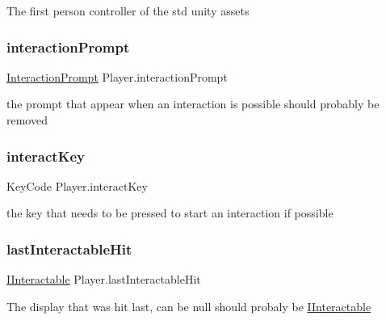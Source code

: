 The first person controller of the std unity assets 

\mbox{\label{class_player_aa1545460a9996f71150823c51dc60ab5}} 
\subsubsection{\texorpdfstring{interaction\+Prompt}{interactionPrompt}}
{\footnotesize\ttfamily \mbox{\hyperlink{class_interaction_prompt}{Interaction\+Prompt}} Player.\+interaction\+Prompt\hspace{0.3cm}{\ttfamily [private]}}



the prompt that appear when an interaction is possible should probably be removed 

\mbox{\label{class_player_ad17e0e6b44972e1c99a08fbaa38b0672}} 
\subsubsection{\texorpdfstring{interact\+Key}{interactKey}}
{\footnotesize\ttfamily Key\+Code Player.\+interact\+Key\hspace{0.3cm}{\ttfamily [private]}}



the key that needs to be pressed to start an interaction if possible 

\mbox{\label{class_player_ac05f1557fc411c88274df512abb865ac}} 
\subsubsection{\texorpdfstring{last\+Interactable\+Hit}{lastInteractableHit}}
{\footnotesize\ttfamily \mbox{\hyperlink{interface_i_interactable}{I\+Interactable}} Player.\+last\+Interactable\+Hit\hspace{0.3cm}{\ttfamily [private]}}



The display that was hit last, can be null should probaly be \mbox{\hyperlink{interface_i_interactable}{I\+Interactable}} 

